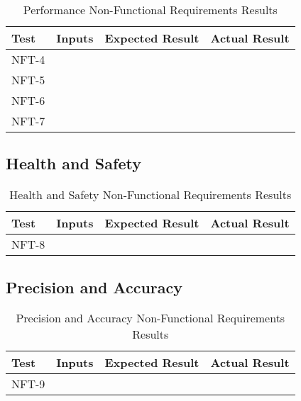 \documentclass[12pt, titlepage]{article}
\begin{document}
\begin{table}[H]
  \centering
    \setlength{\leftmargini}{0cm}
    \begin{tabular}{| >{\centering\arraybackslash}m{1.5cm} | 
      >{\centering\arraybackslash}m{4cm} | 
      >{\centering\arraybackslash}m{4cm} | 
      >{\centering\arraybackslash}m{4cm} |}
    \hline
    \rowcolor[gray]{0.9}
    Test & Inputs & Expected Result & Actual Result\\
    \hline
    NFT-4 &  &  & \\
    \hline
    NFT-5 &  &  & \\
    \hline
    NFT-6 &  &  & \\
    \hline
    NFT-7 &  &  & \\
    \hline
    \end{tabular}
  \caption{Performance Non-Functional Requirements Results}
\end{table}

\subsection{Health and Safety}

\begin{table}[H]
  \centering
    \setlength{\leftmargini}{0cm}
    \begin{tabular}{| >{\centering\arraybackslash}m{1.5cm} | 
      >{\centering\arraybackslash}m{4cm} | 
      >{\centering\arraybackslash}m{4cm} | 
      >{\centering\arraybackslash}m{4cm} |}
    \hline
    \rowcolor[gray]{0.9}
    Test & Inputs & Expected Result & Actual Result\\
    \hline
    NFT-8 &  &  & \\
    \hline
    \end{tabular}
  \caption{Health and Safety Non-Functional Requirements Results}
\end{table}

\subsection{Precision and Accuracy}

\begin{table}[H]
  \centering
    \setlength{\leftmargini}{0cm}
    \begin{tabular}{| >{\centering\arraybackslash}m{1.5cm} | 
      >{\centering\arraybackslash}m{4cm} | 
      >{\centering\arraybackslash}m{4cm} | 
      >{\centering\arraybackslash}m{4cm} |}
    \hline
    \rowcolor[gray]{0.9}
    Test & Inputs & Expected Result & Actual Result\\
    \hline
    NFT-9 &  &  & \\
    \hline
    \end{tabular}
  \caption{Precision and Accuracy Non-Functional Requirements Results}
\end{table}
\end{document}
